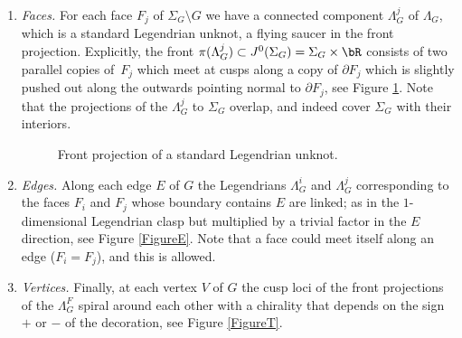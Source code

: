 \documentclass[JEP,XML,SOM,Unicode,NoFloatCountersInSection]{cedram}
\theoremstyle{plain}
\theoremstyle{definition}
\begin{document}
\begin{enumerate}
\item
\textit{Faces.} For each face $F_j$ of $\Sigma_G \setminus G$ we have a connected component $\Lambda^j_G$ of $\Lambda_G$, which is a standard Legendrian unknot, \ie a flying saucer in the front projection. Explicitly, the front $\pi(\Lambda^j_G) \subset J^0(\Sigma_G)=\Sigma_G \times \bR$ consists of two parallel copies of~$F_j$ which meet at cusps along a copy of $\partial F_j$ which is slightly pushed out along the outwards pointing normal to $\partial F_j$, see Figure \ref{FigureLens}. Note that the projections of the $\Lambda^j_G$ to $\Sigma_G$ overlap, and indeed cover $\Sigma_G$ with their interiors.

\begin{figure}[htbp]
\begin{center}
\caption{\smaller Front projection of a standard Legendrian unknot.}
\label{FigureLens}
\end{center}
\end{figure}

\item
\textit{Edges.} Along each edge $E$ of $G$ the Legendrians $\Lambda^{i}_G$ and $\Lambda^{j}_G$ corresponding to the faces $F_i$ and $F_j$ whose boundary contains $E$ are linked; as in the $1$-dimensional Legendrian clasp but multiplied by a trivial factor in the $E$ direction, see Figure \ref{FigureE}. Note that a face could meet itself along an edge (\ie $F_i=F_j$), and this is allowed.

\item
\textit{Vertices.} Finally, at each vertex $V$ of $G$ the cusp loci of the front projections of the $\Lambda^F_G$ spiral around each other with a chirality that depends on the sign $+$ or $-$ of the decoration, see Figure \ref{FigureT}.
\end{enumerate}
\end{document}
